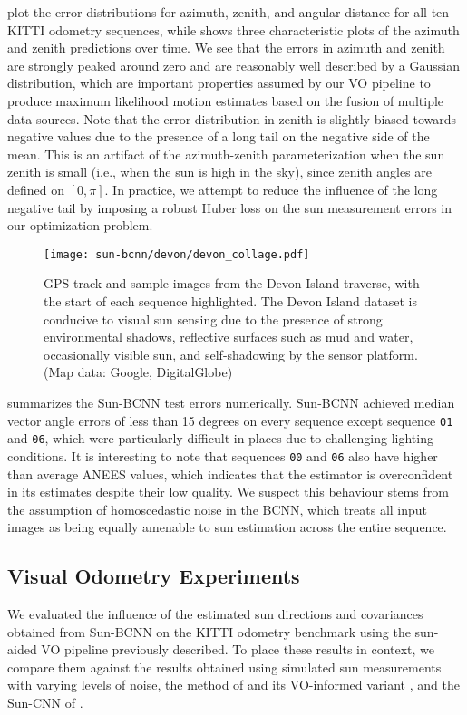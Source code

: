  plot the error distributions for azimuth, zenith, and angular distance for all ten KITTI odometry sequences, while  shows three characteristic plots of the azimuth and zenith predictions over time. 
We see that the errors in azimuth and zenith are strongly peaked around zero and are reasonably well described by a Gaussian distribution, which are important properties assumed by our VO pipeline to produce maximum likelihood motion estimates based on the fusion of multiple data sources.
Note that the error distribution in zenith is slightly biased towards negative values due to the presence of a long tail on the negative side of the mean.
This is an artifact of the azimuth-zenith parameterization when the sun zenith is small (i.e., when the sun is high in the sky), since zenith angles are defined on $[0,\pi]$.
In practice, we attempt to reduce the influence of the long negative tail by imposing a robust Huber loss on the sun measurement errors in our optimization problem.

\begin{figure*}[ht!]
	\centering
	\texttt{[image: sun-bcnn/devon/devon\_collage.pdf]}	
	\caption{GPS track and sample images from the Devon Island traverse, with the start of each sequence highlighted. The Devon Island dataset is conducive to visual sun sensing due to the presence of strong environmental shadows, reflective surfaces such as mud and water, occasionally visible sun, and self-shadowing by the sensor platform. (Map data: Google, DigitalGlobe)}
	\label{fig:devon_collage}
\end{figure*}

 summarizes the Sun-BCNN test errors numerically.
Sun-BCNN achieved median vector angle errors of less than 15 degrees on every sequence except sequence \texttt{01} and \texttt{06}, which were particularly difficult in places due to challenging lighting conditions.
It is interesting to note that sequences \texttt{00} and \texttt{06} also have higher than average ANEES values, which indicates that the estimator is overconfident in its estimates despite their low quality.
We suspect this behaviour stems from the assumption of homoscedastic noise in the BCNN, which treats all input images as being equally amenable to sun estimation across the entire sequence.

\subsection{Visual Odometry Experiments}
We evaluated the influence of the estimated sun directions and covariances obtained from Sun-BCNN on the KITTI odometry benchmark using the sun-aided VO pipeline previously described.
To place these results in context, we compare them against the results obtained using simulated sun measurements with varying levels of noise, the method of \citet{Lalonde2011-jw} and its VO-informed variant \citep{2017_Clement_Improving}, and the Sun-CNN of \citet{Ma2016-at}.

